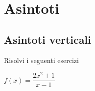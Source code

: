 \chapter{Asintoti}
\section{Asintoti verticali}
Risolvi i seguenti esercizi
\tcbstartrecording
\begin{exercise}[no solution]
	$f(x)= \dfrac{2x^2+1}{x-1}$
\end{exercise}

